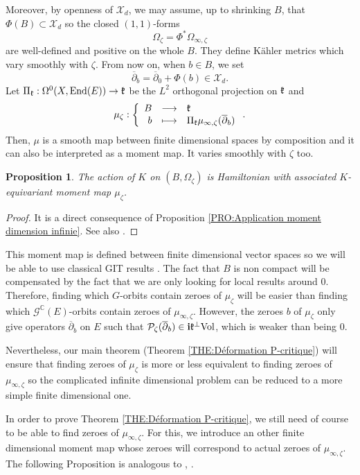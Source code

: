 \documentclass{article}
\newtheorem{proposition}[theorem]{Proposition}
\theoremstyle{remark}
\theoremstyle{definition}
\newcommand{\C}{\mathbb{C}}
\newcommand{\End}{\mathrm{End}}
\newcommand{\Vol}{\mathrm{Vol}}
\renewcommand{\i}{\boldsymbol{\mathrm{i}}}
\newcommand{\G}{\mathcal{G}}
\newcommand{\mP}{\mathcal{P}}
\newcommand{\mX}{\mathcal{X}}
\newcommand{\dbar}{\overline{\partial}}
\newcommand{\fonction}[4]{\left\{ \begin{array}{rcl}
		\displaystyle #1 & \longrightarrow & \displaystyle #2\\
		\displaystyle #3 & \longmapsto & \displaystyle #4
	\end{array} \right.}
\begin{document}
Moreover, by openness of $\mX_d$, we may assume, up to shrinking $B$, that $\Phi(B) \subset \mX_d$ so the closed $(1,1)$-forms
$$
\Omega_\zeta = \Phi^*\Omega_{\infty,\zeta}
$$
are well-defined and positive on the whole $B$. They define Kähler metrics which vary smoothly with $\zeta$. From now on, when $b \in B$, we set
$$
\dbar_b = \dbar_0 + \Phi(b) \in \mX_d.
$$
Let $\Pi_{\frak{k}} : \Omega^0(X,\End(E)) \rightarrow \frak{k}$ be the $L^2$ orthogonal projection on $\frak{k}$ and
$$
\mu_\zeta : \fonction{B}{\frak{k}}{b}{\Pi_{\frak{k}}\mu_{\infty,\zeta}(\dbar_b)}.
$$
Then, $\mu$ is a smooth map between finite dimensional spaces by composition and it can also be interpreted as a moment map. It varies smoothly with $\zeta$ too.

\begin{proposition}
    The action of $K$ on $(B,\Omega_\zeta)$ is Hamiltonian with associated $K$-equivariant moment map $\mu_\zeta$.
\end{proposition}
\begin{proof}
It is a direct consequence of Proposition \ref{PRO:Application moment dimension infinie}. See also \cite[Theorem 6.8]{Dervan_Hallam}.
\end{proof}

This moment map is defined between finite dimensional vector spaces so we will be able to use classical GIT results \cite{DMS}. The fact that $B$ is non compact will be compensated by the fact that we are only looking for local results around $0$. Therefore, finding which $G$-orbits contain zeroes of $\mu_\zeta$ will be easier than finding which $\G^\C(E)$-orbits contain zeroes of $\mu_{\infty,\zeta}$. However, the zeroes $b$ of $\mu_\zeta$ only give operators $\dbar_b$ on $E$ such that $\mP_\zeta(\dbar_b) \in \i\frak{k}^\bot\Vol$, which is weaker than being $0$.

Nevertheless, our main theorem (Theorem \ref{THE:Déformation P-critique}) will ensure that finding zeroes of $\mu_\zeta$ is more or less equivalent to finding zeroes of $\mu_{\infty,\zeta}$ so the complicated infinite dimensional problem can be reduced to a more simple finite dimensional one.

In order to prove Theorem \ref{THE:Déformation P-critique}, we still need of course to be able to find zeroes of $\mu_{\infty,\zeta}$. For this, we introduce an other finite dimensional moment map whose zeroes will correspond to actual zeroes of $\mu_{\infty,\zeta}$. The following Proposition is analogous to \cite[Proposition 3.2]{Clarke_Tipler}, \cite[Proposition 4.1]{Delloque_2024}.
\end{document}
